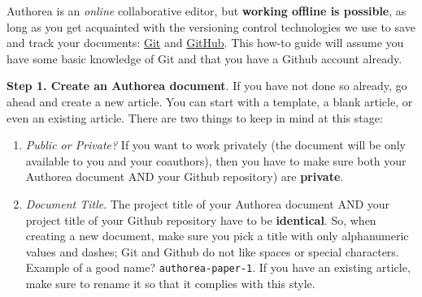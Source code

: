 Authorea is an \textit{online} collaborative editor, but \textbf{working offline is possible}, as long as you get acquainted with the versioning control technologies we use to save and track your documents: \href{http://git-scm.com/}{Git} and \href{http://github.com/}{GitHub}. This how-to guide will assume you have some basic knowledge of Git and that you have a Github account already. 

\textbf{Step 1. Create an Authorea document}. If you have not done so already, go ahead and create a new article. You can start with a template, a blank article, or even an existing article. There are two things to keep in mind at this stage:

\begin{enumerate}
\item \textit{Public or Private?} If you want to work privately (the document will be only available to you and your coauthors), then you have to make sure both your Authorea document AND your Github repository) are \textbf{private}.
\item \textit{Document Title}. The project title of your Authorea document AND your project title of your Github repository have to be \textbf{identical}. So, when creating a new document, make sure you pick a title with only alphanumeric values and dashes; Git and Github do not like spaces or special characters. Example of a good name? \verb|authorea-paper-1|. If you have an existing article, make sure to rename it so that it complies with this style.
\end{enumerate}
